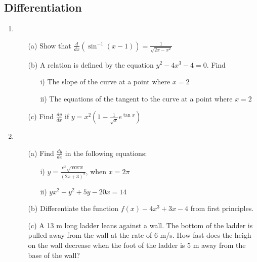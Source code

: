 \subsection{Differentiation}

\begin{enumerate}
	\item 
	\begin{enumerate}[topsep=0ex,itemsep=0ex,partopsep=1ex,parsep=1ex]
		\item[(a)] Show that $\frac{d}{dx}( \sin^{-1}(x-1) )= \frac{1}{\sqrt{2x - x^2}}$
		
		\item[(b)] A relation is defined by the equation $y^2 - 4x^3 - 4 = 0$. Find
		\begin{enumerate}[topsep=0ex,itemsep=0ex,partopsep=1ex,parsep=1ex]
			\item[i)] The slope of the curve at a point where $x = 2$
			\item[ii)] The equations of the tangent to the curve at a point where $x=2$
		\end{enumerate}
		
		\item[(c)] Find $\frac{dy}{dx}$ if $y = x^2\left(1 - \frac{1}{\sqrt{x}}e^{\tan{x}}\right)$
	\end{enumerate}
	
	\item
	\begin{enumerate}[topsep=0ex,itemsep=0ex,partopsep=1ex,parsep=1ex]
		\item[(a)] Find $\frac{dy}{dx}$ in the following equations:
		\begin{enumerate}[topsep=0ex,itemsep=0ex,partopsep=1ex,parsep=1ex]
			\item[i)] $y = \frac{e^x\sqrt{\cos{x}}}{(2x + 3)^2}$, when $x = 2\pi$
			\item[ii)] $yx^2 - y^2 + 5y - 20x = 14$
		\end{enumerate}
		
		\item[(b)] Differentiate the function $f(x) - 4x^3 + 3x - 4$ from first principles.
		
		\item[(c)] A 13 m long ladder leans against a wall. The bottom of the ladder is pulled away from the wall at the rate of 6 m/s. How fast does the heigh on the wall decrease when the foot of the ladder is 5 m away from the base of the wall? 
	\end{enumerate}
	

\end{enumerate}
